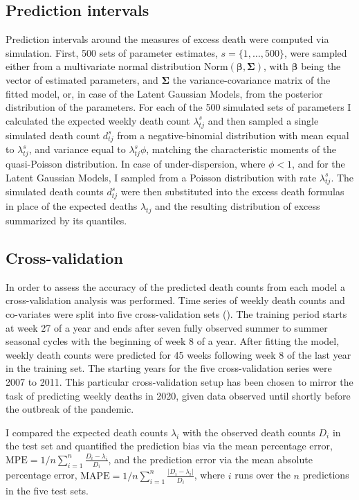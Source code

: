 \documentclass[10pt,letterpaper]{article}
\begin{document}
\subsection*{Prediction intervals}

Prediction intervals around the measures of excess death were computed via simulation. First, 500 sets of parameter estimates, $s=\{1,\ldots,500\}$, were sampled either from a multivariate normal distribution $\text{Norm}(\boldsymbol{\beta}, \boldsymbol{\Sigma})$, with $\boldsymbol{\beta}$ being the vector of estimated parameters, and $\boldsymbol{\Sigma}$ the variance-covariance matrix of the fitted model, or, in case of the Latent Gaussian Models, from the posterior distribution of the parameters. For each of the 500 simulated sets of parameters I calculated the expected weekly death count $\lambda_{tj}^s$ and then sampled a single simulated death count $d_{tj}^s$ from a negative-binomial distribution with mean equal to $\lambda_{tj}^s$, and variance equal to $\lambda_{tj}^s\phi$, matching the characteristic moments of the quasi-Poisson distribution. In case of under-dispersion, where $\phi<1$, and for the Latent Gaussian Models, I sampled from a Poisson distribution with rate $\lambda_{tj}^s$. The simulated death counts $d_{tj}^s$ were then substituted into the excess death formulas in place of the expected deaths $\lambda_{tj}$ and the resulting distribution of excess summarized by its quantiles.

\subsection*{Cross-validation}

In order to assess the accuracy of the predicted death counts from each model a cross-validation analysis was performed. Time series of weekly death counts and co-variates were split into five cross-validation sets (). The training period starts at week 27 of a year and ends after seven fully observed summer to summer seasonal cycles with the beginning of week 8 of a year. After fitting the model, weekly death counts were predicted for 45 weeks following week 8 of the last year in the training set. The starting years for the five cross-validation series were 2007 to 2011. This particular cross-validation setup has been chosen to mirror the task of predicting weekly deaths in 2020, given data observed until shortly before the outbreak of the pandemic.

I compared the expected death counts $\lambda_i$ with the observed death counts $D_i$ in the test set and quantified the prediction bias via the mean percentage error, $\text{MPE} = 1/n\sum_{i=1}^n \frac {D_i - \lambda_i} {D_i}$, and the prediction error via the mean absolute percentage error, $\text{MAPE} = 1/n\sum_{i=1}^n\frac {|D_i - \lambda_i|} {D_i}$, where $i$ runs over the $n$ predictions in the five test sets.
\end{document}
